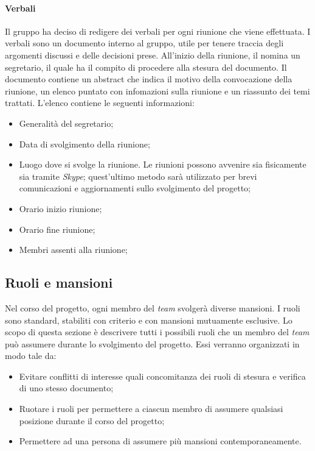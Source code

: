 			\paragraph{Verbali}
			Il gruppo ha deciso di redigere dei verbali per ogni riunione che viene effettuata. I verbali sono un documento interno al gruppo, utile per tenere traccia degli argomenti discussi e delle decisioni prese. All'inizio della riunione, il \textit{\RdP} nomina un segretario, il quale ha il compito di procedere alla stesura del documento. Il documento contiene un abstract che indica il motivo della convocazione della riunione, un elenco puntato con infomazioni sulla riunione e un riassunto dei temi trattati. L'elenco contiene le seguenti informazioni:
			\begin{itemize}
				\item Generalità del segretario;
				\item Data di svolgimento della riunione;
				\item Luogo dove si svolge la riunione. Le riunioni possono avvenire sia fisicamente sia tramite \textit{Skype}; quest'ultimo metodo sarà utilizzato per brevi comunicazioni e aggiornamenti sullo svolgimento del progetto;
				\item Orario inizio riunione;
				\item Orario fine riunione;
				\item Membri assenti alla riunione;
			\end{itemize}

	\subsection{Ruoli e mansioni}
	Nel corso del progetto, ogni membro del \textit{team} svolgerà diverse mansioni. I ruoli sono standard, stabiliti con criterio e con mansioni mutuamente esclusive. Lo scopo di questa sezione è descrivere tutti i possibili ruoli che un membro del \textit{team} può assumere durante lo svolgimento del progetto. Essi verranno organizzati in modo tale da:
	\begin{itemize}
		\item Evitare conflitti di interesse quali concomitanza dei ruoli di stesura e verifica di uno stesso documento;
		\item Ruotare i ruoli per permettere a ciascun membro di assumere qualsiasi posizione durante il corso del progetto;
		\item Permettere ad una persona di assumere più mansioni contemporaneamente.
	\end{itemize}

